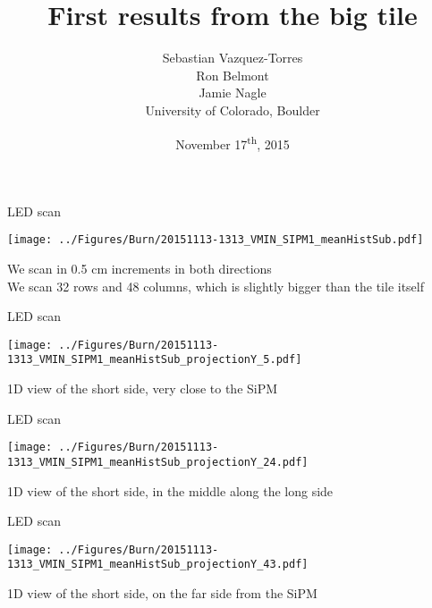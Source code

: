 \documentclass[compress,8pt]{beamer} %
\title[Nov 17, 2015 - Slide \insertframenumber]{First results from the big tile}
\author[CU-Boulder]{Sebastian Vazquez-Torres \\  Ron Belmont \\ Jamie Nagle \\ \vspace{20pt} University of Colorado, Boulder}
\date{November 17\textsuperscript{th}, 2015}
\begin{document}
\begin{frame}
\titlepage
\end{frame}



\begin{frame}{LED scan}
\begin{adjustwidth}{-3em}{-3em}
\begin{center}
\texttt{[image: ../Figures/Burn/20151113-1313\_VMIN\_SIPM1\_meanHistSub.pdf]}
\end{center}
\end{adjustwidth}
We scan in 0.5 cm increments in both directions \\
We scan 32 rows and 48 columns, which is slightly bigger than the tile itself
\end{frame}



\begin{frame}{LED scan}
\begin{adjustwidth}{-3em}{-3em}
\begin{center}
\texttt{[image: ../Figures/Burn/20151113-1313\_VMIN\_SIPM1\_meanHistSub\_projectionY\_5.pdf]}
\end{center}
\end{adjustwidth}
1D view of the short side, very close to the SiPM
\end{frame}



\begin{frame}{LED scan}
\begin{adjustwidth}{-3em}{-3em}
\begin{center}
\texttt{[image: ../Figures/Burn/20151113-1313\_VMIN\_SIPM1\_meanHistSub\_projectionY\_24.pdf]}
\end{center}
\end{adjustwidth}
1D view of the short side, in the middle along the long side
\end{frame}



\begin{frame}{LED scan}
\begin{adjustwidth}{-3em}{-3em}
\begin{center}
\texttt{[image: ../Figures/Burn/20151113-1313\_VMIN\_SIPM1\_meanHistSub\_projectionY\_43.pdf]}
\end{center}
\end{adjustwidth}
1D view of the short side, on the far side from the SiPM
\end{frame}
\end{document}
